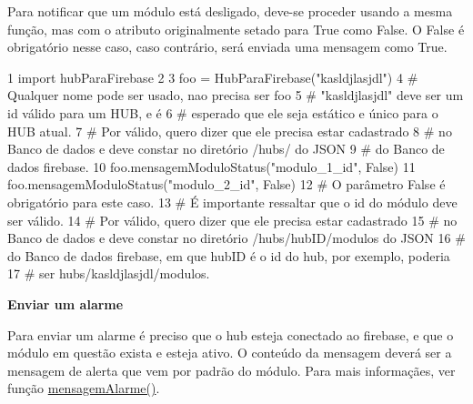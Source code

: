 Para notificar que um módulo está desligado, deve-\/se proceder usando a mesma função, mas com o atributo originalmente setado para True como False. O False é obrigatório nesse caso, caso contrário, será enviada uma mensagem como True.


\begin{DoxyCode}
1 \textcolor{keyword}{import} hubParaFirebase
2 
3 foo = HubParaFirebase(\textcolor{stringliteral}{"kasldjlasjdl"})
4 \textcolor{comment}{#  Qualquer nome pode ser usado, nao precisa ser foo}
5 \textcolor{comment}{#  "kasldjlasjdl" deve ser um id válido para um HUB, e é}
6 \textcolor{comment}{# esperado que ele seja estático e único para o HUB atual.}
7 \textcolor{comment}{#  Por válido, quero dizer que ele precisa estar cadastrado}
8 \textcolor{comment}{# no Banco de dados e deve constar no diretório /hubs/ do JSON}
9 \textcolor{comment}{# do Banco de dados firebase.}
10 foo.mensagemModuloStatus(\textcolor{stringliteral}{"modulo\_1\_id"}, \textcolor{keyword}{False})
11 foo.mensagemModuloStatus(\textcolor{stringliteral}{"modulo\_2\_id"}, \textcolor{keyword}{False})
12 \textcolor{comment}{#  O parâmetro False é obrigatório para este caso.}
13 \textcolor{comment}{#  É importante ressaltar que o id do módulo deve ser válido.}
14 \textcolor{comment}{#  Por válido, quero dizer que ele precisa estar cadastrado}
15 \textcolor{comment}{# no Banco de dados e deve constar no diretório /hubs/hubID/modulos do JSON}
16 \textcolor{comment}{# do Banco de dados firebase, em que hubID é o id do hub, por exemplo, poderia}
17 \textcolor{comment}{# ser hubs/kasldjlasjdl/modulos.}
\end{DoxyCode}


{\bfseries Enviar um alarme}

Para enviar um alarme é preciso que o hub esteja conectado ao firebase, e que o módulo em questão exista e esteja ativo. O conteúdo da mensagem deverá ser a mensagem de alerta que vem por padrão do módulo. Para mais informaçães, ver função \hyperlink{classhub_para_firebase_1_1_hub_para_firebase_aec0b9ed7691e78978716075fe999019a}{mensagem\+Alarme()}.


